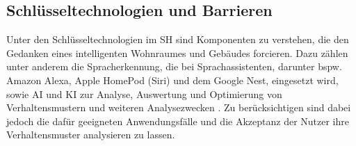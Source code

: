     \subsection*{Schlüsseltechnologien und Barrieren}
        Unter den Schlüsseltechnologien im \acl{SH} sind Komponenten zu verstehen, die den Gedanken eines intelligenten 
        Wohnraumes und Gebäudes forcieren. Dazu zählen unter anderem die Spracherkennung, die bei Sprachassistenten, 
        darunter bspw. Amazon Alexa, Apple HomePod (Siri) und dem Google Nest, eingesetzt wird, sowie \ac{AI} und \ac{KI} 
        zur Analyse, Auswertung und Optimierung von Verhaltensmustern und weiteren Analysezwecken \cite{statista2021}. 
        Zu berücksichtigen sind dabei jedoch die dafür geeigneten Anwendungsfälle und 
        die Akzeptanz der Nutzer ihre Verhaltensmuster analysieren zu lassen.
            
